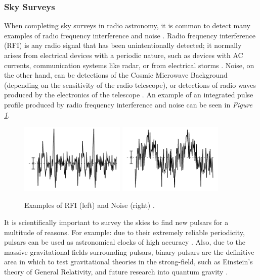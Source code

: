 \documentclass{article}
\begin{document}
\subsubsection{Sky Surveys}

When completing sky surveys in radio astronomy, it is common to detect many examples of radio frequency interference and noise \autocite{hewish:pulsar,lorimer,lyon,tan}. Radio frequency interference (RFI) is any radio signal that has been unintentionally detected; it normally arises from electrical devices with a periodic nature, such as devices with AC currents, communication systems like radar, or from electrical storms \autocite{lorimer}. Noise, on the other hand, can be detections of the Cosmic Microwave Background (depending on the sensitivity of the radio telescope), or detections of radio waves produced by the electronics of the telescope \autocite{lorimer}. An example of an integrated pulse profile produced by radio frequency interference and noise can be seen in \emph{Figure \ref{fig:rfinoise}}.

\begin{figure}[h!]
    \centering
    \includegraphics[width=5cm]{rfi.png}
    \includegraphics[width=5cm]{noise.png}
    \begin{center}
    \caption{Examples of RFI (left) and Noise (right) \autocite{swainston:data}.}
    \label{fig:rfinoise}
    \end{center}
\end{figure}

It is scientifically important to survey the skies to find new pulsars for a multitude of reasons. For example: due to their extremely reliable periodicity, pulsars can be used as astronomical clocks of high accuracy \autocite{matsakis:pulars}. Also, due to the massive gravitational fields surrounding pulsars, binary pulsars are the definitive area in which to test gravitational theories in the strong-field, such as Einstein's theory of General Relativity, and future research into quantum gravity \autocite{lorimer}.
\end{document}
